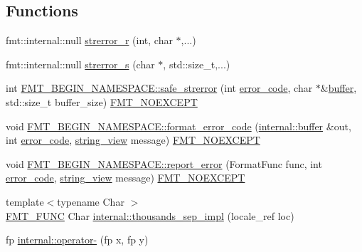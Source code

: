 \subsection*{Functions}
\begin{DoxyCompactItemize}
\item 
fmt\+::internal\+::null \hyperlink{format-inl_8h_a8307cb500850a7c5033cf64702e15990}{strerror\+\_\+r} (int, char $\ast$,...)
\item 
fmt\+::internal\+::null \hyperlink{format-inl_8h_a3bbfb7ce6b764966d8cf5d018589375e}{strerror\+\_\+s} (char $\ast$, std\+::size\+\_\+t,...)
\item 
int \hyperlink{namespace_f_m_t___b_e_g_i_n___n_a_m_e_s_p_a_c_e_a3770dc340d58166b701180e092935e12}{F\+M\+T\+\_\+\+B\+E\+G\+I\+N\+\_\+\+N\+A\+M\+E\+S\+P\+A\+C\+E\+::safe\+\_\+strerror} (int \hyperlink{classerror__code}{error\+\_\+code}, char $\ast$\&\hyperlink{printf_8h_ae986769e0053f875cd11c9fa4d22c8a8}{buffer}, std\+::size\+\_\+t buffer\+\_\+size) \hyperlink{core_8h_aef128913e8400683b1cbd1a3a2e11df3}{F\+M\+T\+\_\+\+N\+O\+E\+X\+C\+E\+PT}
\item 
void \hyperlink{namespace_f_m_t___b_e_g_i_n___n_a_m_e_s_p_a_c_e_ad71fe6b856abb34c3351b17daaaae709}{F\+M\+T\+\_\+\+B\+E\+G\+I\+N\+\_\+\+N\+A\+M\+E\+S\+P\+A\+C\+E\+::format\+\_\+error\+\_\+code} (\hyperlink{namespaceinternal_a5fcdbc3efad1f390e6c3f0fdafa56122}{internal\+::buffer} \&out, int \hyperlink{classerror__code}{error\+\_\+code}, \hyperlink{core_8h_a17e3ff7f9ac2b8f068f719b829890036}{string\+\_\+view} message) \hyperlink{core_8h_aef128913e8400683b1cbd1a3a2e11df3}{F\+M\+T\+\_\+\+N\+O\+E\+X\+C\+E\+PT}
\item 
void \hyperlink{namespace_f_m_t___b_e_g_i_n___n_a_m_e_s_p_a_c_e_a9a8134e5f6a1fb2e4fca1b8efdbb3927}{F\+M\+T\+\_\+\+B\+E\+G\+I\+N\+\_\+\+N\+A\+M\+E\+S\+P\+A\+C\+E\+::report\+\_\+error} (Format\+Func func, int \hyperlink{classerror__code}{error\+\_\+code}, \hyperlink{core_8h_a17e3ff7f9ac2b8f068f719b829890036}{string\+\_\+view} message) \hyperlink{core_8h_aef128913e8400683b1cbd1a3a2e11df3}{F\+M\+T\+\_\+\+N\+O\+E\+X\+C\+E\+PT}
\item 
{\footnotesize template$<$typename Char $>$ }\\\hyperlink{format_8h_a02c8898388e0ae59aab58be14fcd4e05}{F\+M\+T\+\_\+\+F\+U\+NC} Char \hyperlink{namespaceinternal_a70aa19597fbb8bad857a307b17c6b478}{internal\+::thousands\+\_\+sep\+\_\+impl} (locale\+\_\+ref loc)
\item 
fp \hyperlink{namespaceinternal_a7e865636bf5c10d44d1dfb4d9ec22c79}{internal\+::operator-\/} (fp x, fp y)

\end{DoxyCompactItemize}
